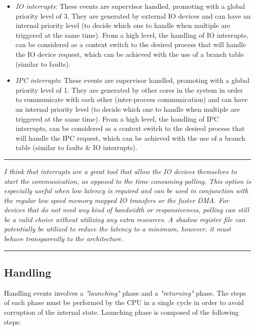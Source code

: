 \documentclass{article}
\begin{document}
            \begin{itemize}

                \item \textit{IO interrupts}: These events are supervisor handled, promoting with a global priority level of 3. They are generated by external IO devices and can have an internal priority level (to decide which one to handle when multiple are triggered at the same time). From a high level, the handling of IO interrupts, can be considered as a context switch to the desired process that will handle the IO device request, which can be achieved with the use of a branch table (similar to faults).
                \item \textit{IPC interrupts}: These events are supervisor handled, promoting with a global priority level of 1. They are generated by other cores in the system in order to communicate with each other (inter-process communication) and can have an internal priority level (to decide which one to handle when multiple are triggered at the same time). From a high level, the handling of IPC interrupts, can be considered as a context switch to the desired process that will handle the IPC request, which can be achieved with the use of a branch table (similar to faults \& IO interrupts).

            \end{itemize}

        \par\noindent\rule{\textwidth}{0.4pt}
        \textit{I think that interrupts are a great tool that allow the IO devices themselves to start the communication, as opposed to the time consuming polling. This option is especially useful when low latency is required and can be used in conjunction with the regular low speed memory mapped IO transfers or the faster DMA. For devices that do not need any kind of bandwidth or responsiveness, polling can still be a valid choice without utilizing any extra resources. A shadow register file can potentially be utilized to reduce the latency to a minimum, however, it must behave transparently to the architecture.}
        \par\noindent\rule{\textwidth}{0.4pt}

        \subsection{Handling}

            Handling events involves a \textit{"launching"} phase and a \textit{"returning"} phase. The steps of each phase must be performed by the CPU in a single cycle in order to avoid corruption of the internal state. Launching phase is composed of the following steps:
\end{document}

